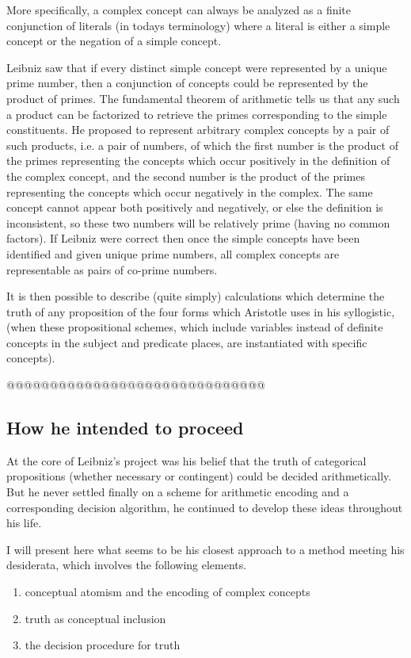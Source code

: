 More specifically, a complex concept can always be analyzed as a finite conjunction of literals (in todays terminology) where a literal is either a simple concept or the negation of a simple concept.

Leibniz saw that if every distinct simple concept were represented by a unique prime number, then a conjunction of concepts could be represented by the product of primes.
The fundamental theorem of arithmetic tells us that any such a product can be factorized to retrieve the primes corresponding to the simple constituents.
He proposed to represent arbitrary complex concepts by a pair of such products, i.e. a pair of numbers, of which the first number is the product of the primes representing the concepts which occur positively in the definition of the complex concept, and the second number is the product of the primes representing the concepts which occur negatively in the complex.
The same concept cannot appear both positively and negatively, or else the definition is inconsistent, so these two numbers will be relatively prime (having no common factors).
If Leibniz were correct then once the simple concepts have been identified and given unique prime numbers, all complex concepts are representable as pairs of co-prime numbers.

It is then possible to describe (quite simply) calculations which determine the truth of any proposition of the four forms which Aristotle uses in his syllogistic, (when these propositional schemes, which include variables instead of definite concepts in the subject and predicate places, are instantiated with specific concepts).



@@@@@@@@@@@@@@@@@@@@@@@@@@@@@@

\subsection{How he intended to proceed}

At the core of Leibniz's project was his belief that the truth of categorical
propositions (whether necessary or contingent) could be decided arithmetically.
But he never settled finally on a scheme for arithmetic encoding and a corresponding
decision algorithm, he continued to develop these ideas throughout his life.

I will present here what seems to be his closest approach to a method meeting his
desiderata, which involves the following elements.

\begin{enumerate}
\item conceptual atomism and the encoding of complex concepts
\item truth as conceptual inclusion
\item the decision procedure for truth
\end{enumerate}

